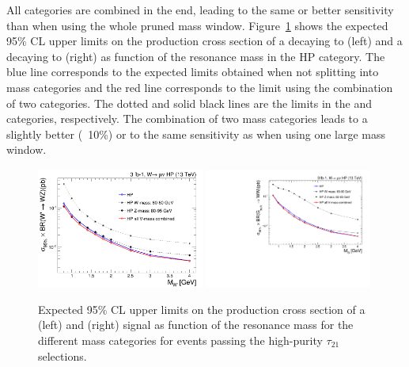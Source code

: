 All categories are combined in the end, leading to the same or better sensitivity than when using the whole pruned mass window. 
Figure~\ref{fig:searchI:massCategories} shows the expected 95\% CL upper limits on the production cross section of a \PWpr decaying to \WZ (left) and a \BulkG decaying to \WW (right) as function of the resonance mass in the HP category. The blue line corresponds to the expected limits obtained when not splitting into mass categories and the red line corresponds to the limit using the combination of two categories. The dotted and solid black lines are the limits in the \PW and \PZ categories, respectively. The combination of two mass categories leads to a slightly better (~10\%) or to the same sensitivity as when using one large mass window.

\begin{figure}[h!p]
 \centering
 \includegraphics[width=0.49\textwidth]{figures/analysis/search1/AN-15-196/massCategories/compare-HP-HPV-Wprime.png}
  \includegraphics[width=0.49\textwidth]{figures/analysis/search1/AN-15-196/massCategories/compare-HP-HPV-BulkG.pdf}
 \caption{Expected 95\% CL upper limits on the production cross section of a \PWpr (left) and \BulkG (right) signal as function of the resonance mass for the different mass categories for events passing the high-purity $\tau_{21}$ selections.}
 \label{fig:searchI:massCategories}
 \end{figure}

